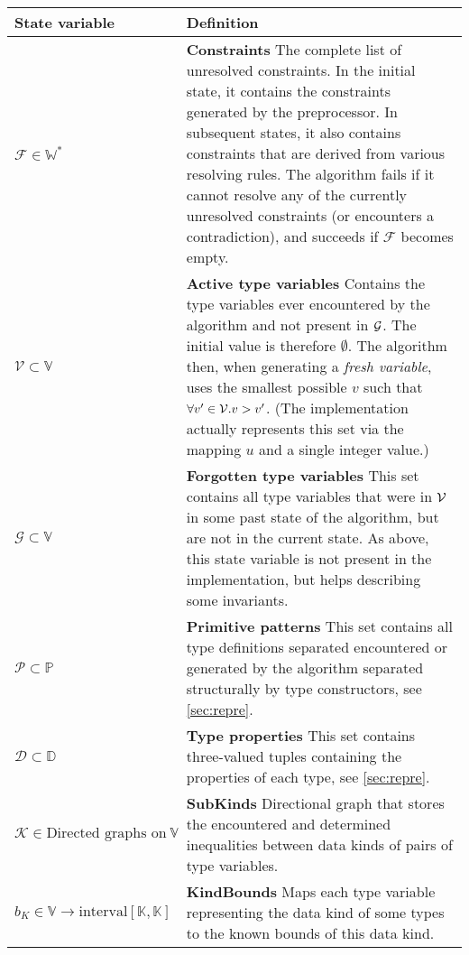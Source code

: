 \begin{table}
\scriptsize
\def\arraystretch{1.3}
\begin{tabular}{p{.23\linewidth}p{.7\linewidth}}
\toprule
State variable & Definition \\
\midrule
  $\mathcal{F} \in \mathbb{W}^\ast$ & \textbf{Constraints}\quad
  The complete list of unresolved constraints. In the initial state, it contains the constraints generated by the preprocessor. In subsequent states, it also contains constraints that are derived from various resolving rules. The algorithm fails if it cannot resolve any of the currently unresolved constraints (or encounters a contradiction), and succeeds if $\mathcal{F}$ becomes empty. \\

  $\mathcal{V} \subset \mathbb{V}$ & \textbf{Active type variables}\quad
  Contains the type variables ever encountered by the algorithm and not present in $\mathcal G$. The initial value is therefore $\emptyset$. The algorithm then, when generating a \emph{fresh variable}, uses the smallest possible $v$ such that $\forall v' \in \mathcal V. v > v'$. (The implementation actually represents this set via the mapping $u$ and a single integer value.) \\

  $\mathcal{G} \subset \mathbb{V}$ & \textbf{Forgotten type variables}\quad
  This set contains all type variables that were in $\mathcal V$ in some past state of the algorithm, but are not in the current state. As above, this state variable is not present in the implementation, but helps describing some invariants. \\

  $\mathcal{P} \subset \mathbb{P}$ & \textbf{Primitive patterns}\quad
  This set contains all type definitions separated encountered or generated by the algorithm separated structurally by type constructors, see \cref{sec:repre}. \\

  $\mathcal{D} \subset \mathbb{D}$ & \textbf{Type properties}\quad
  This set contains three-valued tuples containing the properties of each type, see \cref{sec:repre}. \\

  $\mathcal{K} \in \text{Directed graphs on}\ \mathbb{V}$ & \textbf{SubKinds}\quad
  Directional graph that stores the encountered and determined inequalities between data kinds of pairs of type variables. \\

  $b_K \in \mathbb{V} \to \text{interval} \left[\mathbb{K}, \mathbb{K}\right]$ & \textbf{KindBounds}\quad
  Maps each type variable representing the data kind of some types to the known bounds of this data kind. \\


\end{tabular}
\end{table}

